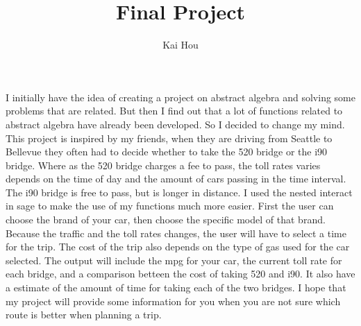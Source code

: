 \documentclass{article}
\title{Final Project}
\author{Kai Hou}
\begin{document}
\maketitle
I initially have the idea of creating a project on abstract algebra and solving some problems that are related. But then I find out that a lot of functions related to abstract algebra have already been developed. So I decided to change my mind. This project is inspired by my friends, when they are driving from Seattle to Bellevue they often had to decide whether to take the 520 bridge or the i90 bridge. Where as the 520 bridge charges a fee to pass, the toll rates varies depends on the time of day and the amount of cars passing in the time interval. The i90 bridge is free to pass, but is longer in distance.
I used the nested interact in sage to make the use of my functions much more easier.
First the user can choose the brand of your car, then choose the specific model of that brand. Because the traffic and the toll rates changes, the user will have to select a time for the trip. The cost of the trip also depends on the type of gas used for the car selected.
The output will include the mpg for your car, the current toll rate for each bridge, and a comparison betteen the cost of taking 520 and i90. It also have a estimate of the amount of time for taking each of the two bridges.
I hope that my project will provide some information for you when you are not sure which route is better when planning a trip.
\end{document}
